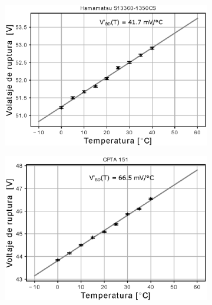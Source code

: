 \begin{figure}[h!]
     \centering
     \caption{Dependencia de la temperatura para el voltaje de ruptura en los SiPM S13360-1350CS de Hamamatsu (izquierda) y CPTA 151 (derecha). Se ajustó una línea recta, cuya pendiente determina el coeficiente de temperatura para el voltaje de ruptura. Se obtuvo $41.7$ mV/$^\circ$C para el S13360-1350CS de Hamamatsu y $66.5$ mV/$^\circ$C para el CPTA 151.}
     \begin{subfigure}[b]{0.49\textwidth}
         \centering
         \includegraphics[width=1.1\textwidth]{Images/Vbd_vs_T_S13360.eps}
         \label{fig:V_vd_13360}
     \end{subfigure}
     \begin{subfigure}[b]{0.49\textwidth}
         \centering
         \includegraphics[width=1.1\textwidth]{Images/Vbd_vs_T_CPTA151.eps}
         \label{fig:V_vd_cpta}
     \end{subfigure}
        \label{fig:Vbd_vs_T}
\end{figure}
